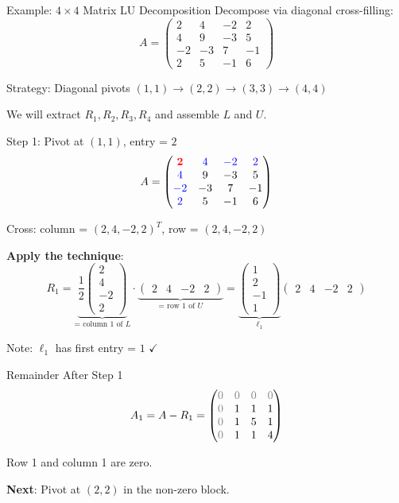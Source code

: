 \documentclass[10pt]{beamer}
\theoremstyle{definition}
\newcommand{\pvt}[1]{{\color{red}\mathbf{#1}}}       %
\newcommand{\crs}[1]{{\color{blue}#1}}                %
\newcommand{\rem}[1]{{\color{gray}#1}}                %
\begin{document}
\begin{frame}{Example: $4 \times 4$ Matrix LU Decomposition}
Decompose via diagonal cross-filling:
$$A = \begin{pmatrix}
2 & 4 & -2 & 2 \\
4 & 9 & -3 & 5 \\
-2 & -3 & 7 & -1 \\
2 & 5 & -1 & 6
\end{pmatrix}$$

\vfill
Strategy: Diagonal pivots $(1,1) \to (2,2) \to (3,3) \to (4,4)$

\vfill
We will extract $R_1, R_2, R_3, R_4$ and assemble $L$ and $U$.
\end{frame}

\begin{frame}{Step 1: Pivot at $(1,1)$, entry = $2$}
$$A = \begin{pmatrix}
\pvt{2} & \crs{4} & \crs{-2} & \crs{2} \\
\crs{4} & 9 & -3 & 5 \\
\crs{-2} & -3 & 7 & -1 \\
\crs{2} & 5 & -1 & 6
\end{pmatrix}$$

Cross: column = $(2, 4, -2, 2)^T$, row = $(2, 4, -2, 2)$

\vfill
\textbf{Apply the technique}:
$$R_1 = \underbrace{\frac{1}{2} \begin{pmatrix} 2 \\ 4 \\ -2 \\ 2 \end{pmatrix}}_{\text{= column 1 of } L}
\cdot \underbrace{\begin{pmatrix} 2 & 4 & -2 & 2 \end{pmatrix}}_{\text{= row 1 of } U}
= \underbrace{\begin{pmatrix} 1 \\ 2 \\ -1 \\ 1 \end{pmatrix}}_{\ell_1}
\begin{pmatrix} 2 & 4 & -2 & 2 \end{pmatrix}$$

Note: $\ell_1$ has first entry = $1$ $\checkmark$
\end{frame}

\begin{frame}{Remainder After Step 1}
$$A_1 = A - R_1 = \begin{pmatrix}
\rem{0} & \rem{0} & \rem{0} & \rem{0} \\
\rem{0} & 1 & 1 & 1 \\
\rem{0} & 1 & 5 & 1 \\
\rem{0} & 1 & 1 & 4
\end{pmatrix}$$

\vfill
Row 1 and column 1 are \rem{zero}.

\vfill
\textbf{Next}: Pivot at $(2,2)$ in the non-zero block.
\end{frame}
\end{document}
